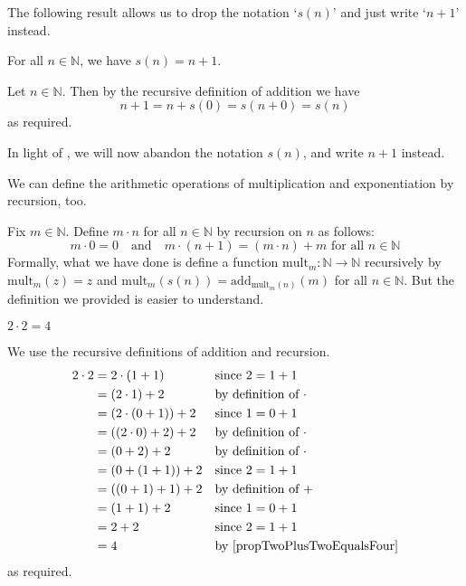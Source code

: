 The following result allows us to drop the notation `$s(n)$' and just write `$n+1$' instead.

\begin{proposition}
\label{propSuccessorIsPlusOne}
For all $n \in \mathbb{N}$, we have $s(n) = n+1$.
\end{proposition}

\begin{cproof}
Let $n \in \mathbb{N}$. Then by the recursive definition of addition we have
\[ n+1 = n+s(0) = s(n+0) = s(n) \]
as required.
\end{cproof}

In light of , we will now abandon the notation $s(n)$, and write $n+1$ instead.

We can define the arithmetic operations of multiplication and exponentiation by recursion, too.

\begin{example}
Fix $m \in \mathbb{N}$. Define $m \cdot n$ for all $n \in \mathbb{N}$ by recursion on $n$ as follows:
\[ m \cdot 0 = 0 \quad \text{and} \quad m \cdot (n+1) = (m \cdot n) + m \text{ for all } n \in \mathbb{N} \]
Formally, what we have done is define a function $\mathrm{mult}_m : \mathbb{N} \to \mathbb{N}$ recursively by $\mathrm{mult}_m(z)=z$ and $\mathrm{mult}_m(s(n)) = \mathrm{add}_{\mathrm{mult}_m(n)}(m)$ for all $n \in \mathbb{N}$. But the definition we provided is easier to understand.
\end{example}

\begin{proposition}
\label{propTwoTimesTwoEqualsFour}
$2 \cdot 2 = 4$
\end{proposition}

\begin{cproof}
We use the recursive definitions of addition and recursion.
\begin{align*}
2 \cdot 2 &= 2 \cdot (1+1) && \text{since $2=1+1$} \\
&= (2 \cdot 1) + 2 && \text{by definition of $\cdot$} \\
&= (2 \cdot (0+1)) + 2 && \text{since $1 = 0 + 1$} \\
&= ((2 \cdot 0) + 2) + 2 && \text{by definition of $\cdot$} \\
&= (0+2) + 2 && \text{by definition of $\cdot$} \\
&= (0+(1+1)) + 2 && \text{since $2=1+1$} \\
&= ((0+1)+1) + 2 && \text{by definition of $+$} \\
&= (1+1) + 2 && \text{since $1=0+1$} \\
&= 2+2 && \text{since $2=1+1$} \\
&= 4 && \text{by \Cref{propTwoPlusTwoEqualsFour}}
\end{align*}
as required.
\end{cproof}

